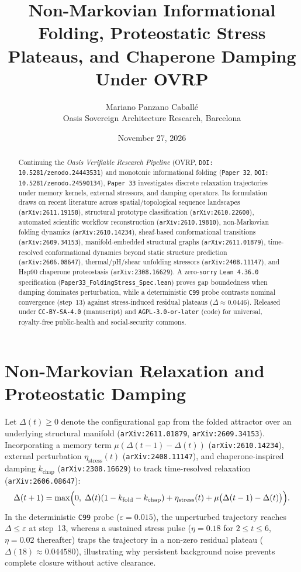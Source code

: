 \documentclass[11pt,a4paper]{article}
\title{Non-Markovian Informational Folding, Proteostatic Stress Plateaus, and Chaperone Damping Under OVRP}
\author{Mariano Panzano Caball\'e \\ \small Oasis Sovereign Architecture Research, Barcelona}
\date{November 27, 2026}
\begin{document}
\maketitle

\begin{abstract}
Continuing the \emph{Oasis Verifiable Research Pipeline} (OVRP, \texttt{DOI: 10.5281/zenodo.24443531}) and monotonic informational folding (\texttt{Paper~32}, \texttt{DOI: 10.5281/zenodo.24590134}), \texttt{Paper~33} investigates discrete relaxation trajectories under memory kernels, external stressors, and damping operators. Its formulation draws on recent literature across spatial/topological sequence landscapes (\texttt{arXiv:2611.19158}), structural prototype classification (\texttt{arXiv:2610.22600}), automated scientific workflow reconstruction (\texttt{arXiv:2610.19810}), non-Markovian folding dynamics (\texttt{arXiv:2610.14234}), sheaf-based conformational transitions (\texttt{arXiv:2609.34153}), manifold-embedded structural graphs (\texttt{arXiv:2611.01879}), time-resolved conformational dynamics beyond static structure prediction (\texttt{arXiv:2606.08647}), thermal/pH/shear unfolding stressors (\texttt{arXiv:2408.11147}), and Hsp90 chaperone proteostasis (\texttt{arXiv:2308.16629}). A zero-\texttt{sorry} \texttt{Lean~4.36.0} specification (\texttt{Paper33\_FoldingStress\_Spec.lean}) proves gap boundedness when damping dominates perturbation, while a deterministic \texttt{C99} probe contrasts nominal convergence (step~13) against stress-induced residual plateaus ($\Delta \approx 0.0446$). Released under \texttt{CC-BY-SA-4.0} (manuscript) and \texttt{AGPL-3.0-or-later} (code) for universal, royalty-free public-health and social-security commons.
\end{abstract}

\section{Non-Markovian Relaxation and Proteostatic Damping}
Let $\Delta(t) \ge 0$ denote the configurational gap from the folded attractor over an underlying structural manifold (\texttt{arXiv:2611.01879}, \texttt{arXiv:2609.34153}). Incorporating a memory term $\mu(\Delta(t-1) - \Delta(t))$ (\texttt{arXiv:2610.14234}), external perturbation $\eta_{\mathrm{stress}}(t)$ (\texttt{arXiv:2408.11147}), and chaperone-inspired damping $k_{\mathrm{chap}}$ (\texttt{arXiv:2308.16629}) to track time-resolved relaxation (\texttt{arXiv:2606.08647}):
\begin{equation}
\Delta(t+1) = \max\Bigl(0,\; \Delta(t)(1 - k_{\mathrm{fold}} - k_{\mathrm{chap}}) + \eta_{\mathrm{stress}}(t) + \mu\bigl(\Delta(t-1) - \Delta(t)\bigr)\Bigr).
\end{equation}
In the deterministic \texttt{C99} probe ($\varepsilon = 0.015$), the unperturbed trajectory reaches $\Delta \le \varepsilon$ at step~13, whereas a sustained stress pulse ($\eta = 0.18$ for $2 \le t \le 6$, $\eta = 0.02$ thereafter) traps the trajectory in a non-zero residual plateau ($\Delta(18) \approx 0.044580$), illustrating why persistent background noise prevents complete closure without active clearance.
\end{document}
